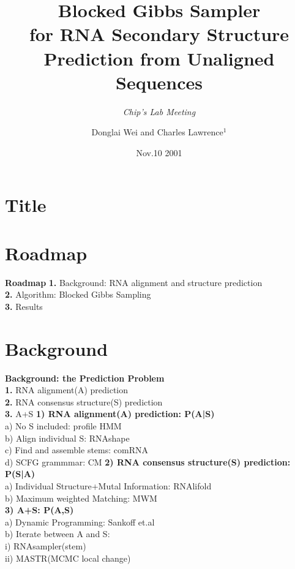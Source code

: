 \documentclass{beamer}
\title[] %
{Blocked Gibbs Sampler\\ for RNA Secondary Structure Prediction from Unaligned Sequences}
\subtitle {\em Chip's Lab Meeting\\} %
\author[] %
{Donglai Wei and Charles Lawrence$^1$}
\institute[ ] %
{$^1$Division of Applied Mathematics,Brown University}
\date[ ] %
{Nov.10 2001}
\begin{document}
\section{Title}
\begin{frame}
  \titlepage
\end{frame}

\section{Roadmap}
\begin{frame}
{\bf Roadmap} 
\textbf{1.} Background: RNA alignment and structure prediction\\
\vspace{0.5cm}
\textbf{2.} Algorithm: Blocked Gibbs Sampling \\
\vspace{0.5cm}
\textbf{3.} Results
\vspace{0.5cm}
\end{frame}

\section{Background}{\bf Background: the Prediction Problem}\\
\vspace{1.0cm}
\textbf{1.} RNA alignment(A) prediction\\
\vspace{0.5cm}
\textbf{2.} RNA consensus structure(S) prediction\\
\vspace{0.5cm}
\textbf{3.} A+S
\newpage
{\bf 1) RNA alignment(A) prediction: P(A|S)}\\
\vspace{1.0cm}
a) No S included: profile HMM \\
\vspace{0.5cm}
b) Align individual S: RNAshape \\
\vspace{0.5cm}
c) Find and assemble stems: comRNA \\
\vspace{0.5cm}
d) SCFG grammmar: CM 
\newpage
{\bf 2) RNA consensus structure(S) prediction: P(S|A)}\\
\vspace{1.0cm}
a) Individual Structure+Mutal Information: RNAlifold \\
\vspace{0.5cm}
b) Maximum weighted Matching: MWM \\
\newpage
{\bf 3) A+S: P(A,S)}\\
\vspace{1.0cm}
a) Dynamic Programming: Sankoff et.al\\
\vspace{0.5cm}
b) Iterate between A and S: \\
\vspace{0.5cm}
    i) RNAsampler(stem) \\
    ii) MASTR(MCMC local change)
\end{document}
